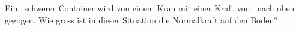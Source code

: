 Ein \mCoO\ schwerer Container wird von einem Kran mit einer Kraft von \FKrO\ nach oben gezogen. Wie gross ist in dieser Situation die Normalkraft auf den Boden?
